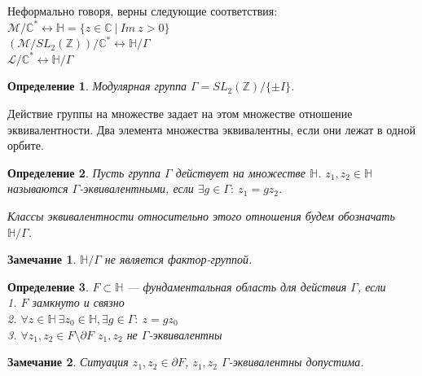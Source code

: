 \documentclass[11pt]{article}
\newtheorem{definition}{Определение}
\newtheorem{remark}{Замечание}
\newcommand{\Z}{\mathbb{Z}}
\begin{document}
Неформально говоря, верны следующие соответствия: \\
$\mathcal{M} / \mathbb{C}^* \longleftrightarrow \mathbb{H} = \{z \in \mathbb{C}\ |\ Im\ z > 0 \}$ \\
$(\mathcal{M}/SL_2(\Z))/\mathbb{C}^* \longleftrightarrow \mathbb{H}/\Gamma$ \\
$\mathcal{L} /\mathbb{C}^* \longleftrightarrow \mathbb{H}/\Gamma$

\begin{definition}
    Модулярная группа $\Gamma = SL_2(\Z) / \{\pm I\}$.
\end{definition}

Действие группы на множестве задает на этом множестве отношение эквивалентности.
Два элемента множества эквивалентны, если они лежат в одной орбите.

\begin{definition}
    Пусть группа $\Gamma$ действует на множестве $\mathbb{H}$.
    $z_1, z_2 \in \mathbb{H}$ называются $\Gamma$-эквивалентными, если $\exists g \in \Gamma:\ z_1 = g z_2$.

    Классы эквивалентности относительно этого отношения будем обозначать $\mathbb{H} / \Gamma$.
\end{definition}

\begin{remark}
    $\mathbb{H} / \Gamma$ не является фактор-группой.
\end{remark}

\begin{definition}
    $F \subset \mathbb{H}$ --- фундаментальная область для действия $\Gamma$, если \\
    1. $F$ замкнуто и связно \\
    2. $\forall z \in \mathbb{H}\ \exists z_0 \in \mathbb{H}, \exists g \in \Gamma:\ z = gz_0$ \\
    3. $\forall z_1, z_2 \in F \setminus \partial F$ $z_1, z_2$ не $\Gamma$-эквивалентны
\end{definition}

\begin{remark}
    Ситуация $z_1, z_2 \in \partial F$, $z_1, z_2$ $\Gamma$-эквивалентны допустима.
\end{remark}
\end{document}
